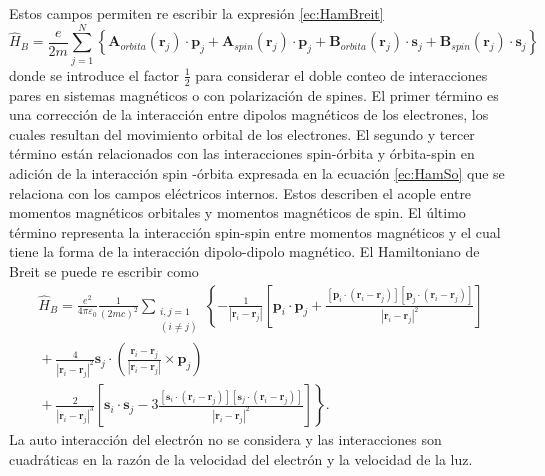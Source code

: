 \documentclass[12pt,a4paper, oneside]{book}
\begin{document}
    Estos campos permiten re escribir la expresi\'on \ref{ec:HamBreit}   
    \begin{equation}
    \hat{H}_B= \frac{e}{2m} \sum_{j=1}^N \left\{\pmb{A}_{orbita} (\pmb{r}_j) \cdot \pmb{p}_j + \pmb{A}_{spin} (\pmb{r}_j) \cdot \pmb{p}_j + \pmb{B}_{orbita} (\pmb{r}_j) \cdot \pmb{s}_j +\pmb{B}_{spin} (\pmb{r}_j) \cdot \pmb{s}_j \right\} \label{ec:breitHam}
    \end{equation}
    donde se introduce el factor $\frac{1}{2}$ para considerar el doble conteo de interacciones pares en sistemas magn\'eticos o con polarizaci\'on de spines. El primer t\'ermino es una correcci\'on de la interacci\'on entre dipolos magn\'eticos de los electrones, los cuales resultan del movimiento orbital de los electrones. El segundo y tercer t\'ermino est\'an relacionados con las interacciones spin-\'orbita y \'orbita-spin en adici\'on de la interacci\'on spin -\'orbita expresada en la ecuaci\'on \ref{ec:HamSo} que se relaciona con los campos el\'ectricos internos. Estos describen el acople entre momentos magn\'eticos orbitales y momentos magn\'eticos de spin. El \'ultimo t\'ermino representa la interacci\'on spin-spin entre momentos magn\'eticos y el cual tiene la forma de la interacci\'on dipolo-dipolo magn\'etico. El Hamiltoniano de Breit se puede re escribir como
    \begin{multline}
    \hat{H}_B = \frac{e^2}{4 \pi \varepsilon_0} \frac{1}{(2 m c)^2} \sum_{\substack{i,j = 1 \\ (i \not = j)}} \left\{- \frac{1}{|\pmb{r}_i-\pmb{r}_j|} \left[\pmb{p}_i \cdot \pmb{p}_j + \frac{[\pmb{p}_i \cdot (\pmb{r}_i-\pmb{r}_j)][\pmb{p}_j \cdot (\pmb{r}_i-\pmb{r}_j)]}{|\pmb{r}_i-\pmb{r}_j|^2} \right] \right. \\ \left. {} + \frac{4}{|\pmb{r}_i-\pmb{r}_j|^2} \pmb{s}_j \cdot \left(\frac{\pmb{r}_i-\pmb{r}_j}{|\pmb{r}_i-\pmb{r}_j|} \times \pmb{p}_j \right) \right. \\
    \left. {} + \frac{2}{|\pmb{r}_i-\pmb{r}_j|^3} \left[\pmb{s}_i \cdot \pmb{s}_j - 3 \frac{[\pmb{s}_i \cdot (\pmb{r}_i - \pmb{r}_j)][\pmb{s}_j \cdot (\pmb{r}_i - \pmb{r}_j)] }{|\pmb{r}_i-\pmb{r}_j|^2} \right] \right\}. \label{ec:HamBreit2}
    \end{multline}
    La auto interacci\'on del electr\'on no se considera y las interacciones son cuadr\'aticas en la raz\'on de la velocidad del electr\'on y la velocidad de la luz.
\end{document}
